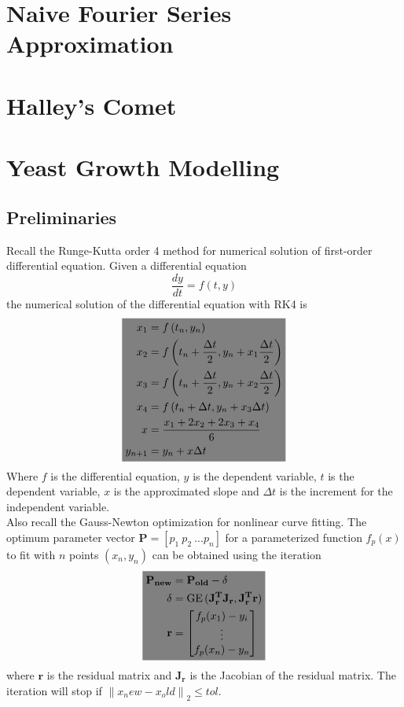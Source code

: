 \documentclass[10pt, twocolumn]{article}
\newcommand{\highlight}[1]{\colorbox{gray}{$\displaystyle#1$}}
\DeclareMathOperator{\GE}{GE}
\begin{document}
	\section{Naive Fourier Series Approximation}
	\section{Halley's Comet}
	\section{Yeast Growth Modelling}
	\subsection{Preliminaries}
	Recall the Runge-Kutta order 4 method for numerical solution of first-order differential equation. Given a differential equation
	$$\frac{dy}{dt} = f(t, y)
	$$
	the numerical solution of the differential equation with RK4 is
	\begin{equation}
	\highlight{
		\begin{aligned}
			x_1 &= f\left(t_n, y_n\right)\\
			x_2 &= f\left(t_n + \frac{\Delta t}{2}, y_n + x_1 \frac{\Delta t}{2}\right)\\
			x_3 &= f\left(t_n + \frac{\Delta t}{2}, y_n + x_2 \frac{\Delta t}{2}\right)\\
			x_4 &= f\left(t_n + \Delta t, y_n + x_3 \Delta t\right)\\
			x &= \frac{x_1+2x_2+2x_3+x_4}{6}\\
			y_{n+1} &= y_n + x\Delta t
		\end{aligned}
	}
	\end{equation}
	Where $f$ is the differential equation, $y$ is the dependent variable, $t$ is the dependent variable, $x$ is the approximated slope and $\Delta t$ is the increment for the independent variable.\\
	Also recall the Gauss-Newton optimization for nonlinear curve fitting. 
	The optimum parameter vector $\mathbf{P}=[p_1\:p_2\:...p_n]$ for a parameterized function $f_p(x)$ to fit with $n$ points $(x_n, y_n)$ can be obtained using the iteration
	\begin{equation}
	\highlight{
		\begin{aligned}
			\mathbf{P_{new}} &= \mathbf{P_{old}} - \delta\\
			\delta &= \GE\mathbf{(J_r^TJ_r, J_r^Tr)}\\
			\mathbf{r} &= 
				\begin{bmatrix}
					f_p(x_1)-y_i\\
					\vdots\\
					f_p(x_n)-y_n\\
				\end{bmatrix}
		\end{aligned}
	}
	\end{equation}
	where $\mathbf{r}$ is the residual matrix and $\mathbf{J_r}$ is the Jacobian of the residual matrix.
	The iteration will stop if $\left\|x_new - x_old\right\|_2 \leq tol$.
	
\end{document}
